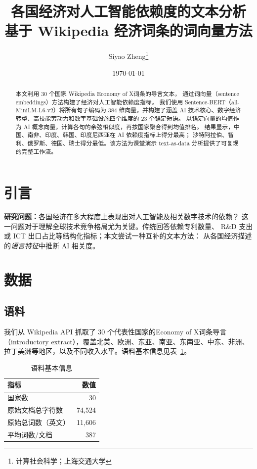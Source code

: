 \documentclass[11pt,a4paper]{article}
\title{\textbf{各国经济对人工智能依赖度的文本分析}\\
\large 基于 Wikipedia 经济词条的词向量方法}
\author{Siyao Zheng\thanks{计算社会科学；上海交通大学}}
\date{\today}
\begin{document}
\maketitle

\begin{abstract}
\noindent 本文利用 30 个国家 Wikipedia \guillemotleft Economy of X\guillemotright 词条的导言文本，
通过词向量（sentence embeddings）方法构建了\guillemotleft 经济对人工智能依赖度\guillemotright 指标。
我们使用 Sentence-BERT（all-MiniLM-L6-v2）将所有句子编码为 384 维向量，并构建了涵盖
AI 技术核心、数字经济转型、高技能劳动力和数字基础设施四个维度的 23 个锚定短语。
以锚定向量的均值作为 AI 概念向量，计算各句的余弦相似度，再按国家聚合得到均值排名。
结果显示，中国、南非、印度、韩国、印度尼西亚在 AI 依赖度指标上得分最高；
沙特阿拉伯、智利、俄罗斯、德国、瑞士得分最低。该方法为课堂演示 text-as-data
分析提供了可复现的完整工作流。
\end{abstract}

\section{引言}

\textbf{研究问题：}各国经济在多大程度上表现出对人工智能及相关数字技术的依赖？
这一问题对于理解全球技术竞争格局尤为关键。传统回答依赖专利数量、
R\&D 支出或 ICT 出口占比等结构化指标；本文尝试一种互补的文本方法：
从各国经济描述的\emph{语言特征}中推断 AI 相关度。

\section{数据}

\subsection{语料}

我们从 Wikipedia API 抓取了 30 个代表性国家的\guillemotleft Economy of X\guillemotright 词条导言
（introductory extract），覆盖北美、欧洲、东亚、南亚、东南亚、中东、非洲、
拉丁美洲等地区，以及不同收入水平。语料基本信息见表~\ref{tab:corpus}。

\begin{table}[H]
\centering
\caption{语料基本信息}
\label{tab:corpus}
\begin{tabular}{lr}
\toprule
\textbf{指标} & \textbf{数值} \\
\midrule
国家数 & 30 \\
原始文档总字符数 & 74,524 \\
原始总词数（英文） & 11,606 \\
平均词数/文档 & 387 \\
\bottomrule
\end{tabular}
\end{table}
\end{document}
